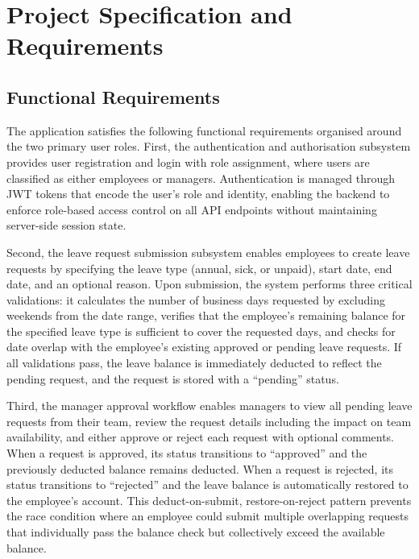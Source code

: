 \documentclass[conference]{IEEEtran}
\begin{document}
\section{Project Specification and Requirements}

\subsection{Functional Requirements}

The application satisfies the following functional requirements organised around the two primary user roles. First, the authentication and authorisation subsystem provides user registration and login with role assignment, where users are classified as either employees or managers. Authentication is managed through JWT tokens that encode the user's role and identity, enabling the backend to enforce role-based access control on all API endpoints without maintaining server-side session state.

Second, the leave request submission subsystem enables employees to create leave requests by specifying the leave type (annual, sick, or unpaid), start date, end date, and an optional reason. Upon submission, the system performs three critical validations: it calculates the number of business days requested by excluding weekends from the date range, verifies that the employee's remaining balance for the specified leave type is sufficient to cover the requested days, and checks for date overlap with the employee's existing approved or pending leave requests. If all validations pass, the leave balance is immediately deducted to reflect the pending request, and the request is stored with a ``pending'' status.

Third, the manager approval workflow enables managers to view all pending leave requests from their team, review the request details including the impact on team availability, and either approve or reject each request with optional comments. When a request is approved, its status transitions to ``approved'' and the previously deducted balance remains deducted. When a request is rejected, its status transitions to ``rejected'' and the leave balance is automatically restored to the employee's account. This deduct-on-submit, restore-on-reject pattern prevents the race condition where an employee could submit multiple overlapping requests that individually pass the balance check but collectively exceed the available balance.
\end{document}
